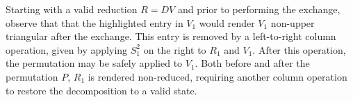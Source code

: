 \documentclass[sn-mathphys]{sn-jnl}
\newcommand\topstrut[1][1.0ex]{\setlength\bigstrutjot{#1}{\bigstrut[t]}}
\newcommand\botstrut[1][0.9ex]{\setlength\bigstrutjot{#1}{\bigstrut[b]}}
\begin{document}
Starting with a valid reduction $R = DV$ and prior to performing the exchange, observe that that the highlighted entry in $V_1$ would render $V_1$ non-upper triangular after the exchange. This entry is removed by a left-to-right column operation, given by applying  $S_1^{2}$ on the right to $R_1$ and $V_1$. After this operation, the permutation may be safely applied to $V_1$. Both before and after the permutation $P$, $R_1$ is rendered non-reduced, requiring another column operation to restore the decomposition to a valid state.
\end{document}
